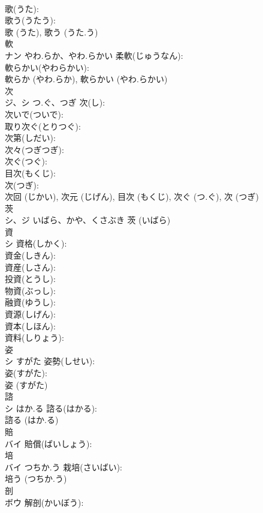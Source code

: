 \documentclass[8pt]{extreport}
\begin{document}
\begin{CJK}{UTF8}{min}
\\	歌(うた): 
\\	歌う(うたう): 
\\	歌 (うた), 歌う (うた.う)
\\	軟		
\\	ナン	やわ.らか、やわ.らかい	柔軟(じゅうなん): 
\\	軟らかい(やわらかい): 
\\	軟らか (やわ.らか), 軟らかい (やわ.らかい)
\\	次		
\\	ジ、シ	つ.ぐ、つぎ	次(し): 
\\	次いで(ついで): 
\\	取り次ぐ(とりつぐ): 
\\	次第(しだい): 
\\	次々(つぎつぎ): 
\\	次ぐ(つぐ): 
\\	目次(もくじ): 
\\	次(つぎ): 
\\	次回 (じかい), 次元 (じげん), 目次 (もくじ), 次ぐ (つ.ぐ), 次 (つぎ)
\\	茨		
\\	シ、ジ	いばら、かや、くさぶき		茨 (いばら)
\\	資		
\\	シ		資格(しかく): 
\\	資金(しきん): 
\\	資産(しさん): 
\\	投資(とうし): 
\\	物資(ぶっし): 
\\	融資(ゆうし): 
\\	資源(しげん): 
\\	資本(しほん): 
\\	資料(しりょう): 
\\	姿		
\\	シ	すがた	姿勢(しせい): 
\\	姿(すがた): 
\\	姿 (すがた)
\\	諮		
\\	シ	はか.る	諮る(はかる): 
\\	諮る (はか.る)
\\	賠			
\\	バイ		賠償(ばいしょう): 
\\	培			
\\	バイ	つちか.う	栽培(さいばい): 
\\	培う (つちか.う)
\\	剖			
\\	ボウ		解剖(かいぼう): 

\end{CJK}
\end{document}
